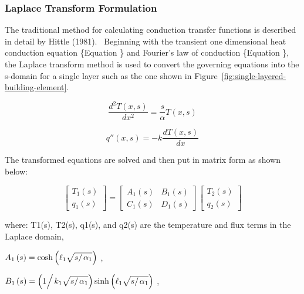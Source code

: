 \subsubsection{Laplace Transform Formulation}\label{laplace-transform-formulation}

The traditional method for calculating conduction transfer functions is described in detail by Hittle (1981).~ Beginning with the transient one dimensional heat conduction equation \{Equation \} and Fourier's law of conduction \{Equation \}, the Laplace transform method is used to convert the governing equations into the s-domain for a single layer such as the one shown in Figure~\ref{fig:single-layered-building-element}.

\begin{equation}
\frac{{{d^2}T\left( {x,s} \right)}}{{d{x^2}}} = \frac{s}{\alpha }T\left( {x,s} \right)
\end{equation}

\begin{equation}
q''\left( {x,s} \right) =  - k\frac{{dT\left( {x,s} \right)}}{{dx}}
\end{equation}

The transformed equations are solved and then put in matrix form as shown below:

\begin{equation}
\left[ 
    {\begin{array}{*{20}{c}}
      {{T_1}\left( s \right)} \\ {{q_1}\left( s \right)}
    \end{array}}
  \right] = \left[ 
    {\begin{array}{*{20}{c}}
      {{A_1}\left( s \right)}&{{B_1}\left( s \right)} \\
      {{C_1}\left( s \right)}&{{D_1}\left( s \right)}
    \end{array}}
  \right] \left[ 
    {\begin{array}{*{20}{c}}
      {{T_2}\left( s \right)} \\
      {{q_2}\left( s \right)}
    \end{array}}
  \right]
\end{equation}

where: T1(s), T2(s), q1(s), and q2(s) are the temperature and flux terms in the Laplace domain,

\({A_1}\left( s \right) = \cosh \left( {{\ell_1}\sqrt {{s \mathord{\left/ {\vphantom {s {{\alpha_1}}}} \right. } {{\alpha_1}}}} } \right)\) ,

\({B_1}\left( s \right) = \left( {{1 \mathord{\left/ {\vphantom {1 {{k_1}\sqrt {{s \mathord{\left/ {\vphantom {s {{\alpha_1}}}} \right. } {{\alpha_1}}}} }}} \right. } {{k_1}\sqrt {{s \mathord{\left/ {\vphantom {s {{\alpha_1}}}} \right. } {{\alpha_1}}}} }}} \right)\sinh \left( {{\ell_1}\sqrt {{s \mathord{\left/ {\vphantom {s {{\alpha_1}}}} \right. } {{\alpha_1}}}} } \right)\) ,

